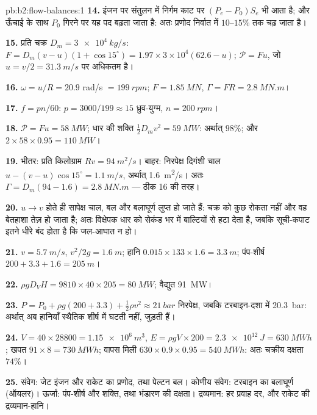 \begin{solution}{pb:b2:flow-balances:1}
\textbf{14.} इंजन पर संतुलन में निर्गम काट पर $(P_e - P_0)S_e$ भी आता है;
और ऊँचाई के साथ $P_0$ गिरने पर यह पद बढ़ता जाता है: अतः प्रणोद
निर्वात में $10$--$15\%$ तक चढ़ जाता है।

\textbf{15.} प्रति चक्र $D_m = \qty{3e4}{kg/s}$: $F = D_m(v - u)(1 + \cos15^\circ) =
1.97 \times 3 \times 10^4(62.6 - u)$; $\mathcal P = Fu$, जो $u = v/2 = \qty{31.3}{m/s}$ पर अधिकतम है।

\textbf{16.} $\omega = u/R = 20.9$ rad/s $= \qty{199}{rpm}$; $F = \qty{1.85}{MN}$, $\Gamma = FR
= \qty{2.8}{MN.m}$।

\textbf{17.} $f = pn/60$: $p = 3000/199 \approx 15$ ध्रुव-युग्म, $n = \qty{200}{rpm}$।

\textbf{18.} $\mathcal P = Fu = \qty{58}{MW}$; धार की शक्ति $\tfrac12D_mv^2 = \qty{59}{MW}$:
अर्थात् $98\%$; और $2 \times 58 \times 0.95 = \qty{110}{MW}$।

\textbf{19.} भीतर: प्रति किलोग्राम $Rv = \qty{94}{m^2/s}$। बाहर: निरपेक्ष दिगंशी चाल
$u - (v - u)\cos15^\circ = \qty{1.1}{m/s}$, अर्थात् \qty{1.6}{m^2/s}। अतः $\Gamma = D_m(94 -
1.6) = \qty{2.8}{MN.m}$ --- ठीक 16 की तरह।

\textbf{20.} $u \to v$ होते ही सापेक्ष चाल, बल और बलाघूर्ण
लुप्त हो जाते हैं: चक्र को कुछ रोकता नहीं और वह बेतहाशा तेज़ हो जाता है; अतः विक्षेपक
धार को सेकंड भर में बाल्टियों से हटा देता है, जबकि सूची-कपाट
इतने धीरे बंद होता है कि जल-आघात न हो।

\textbf{21.} $v = \qty{5.7}{m/s}$, $v^2/2g = \qty{1.6}{m}$; हानि $0.015 \times 133 \times 1.6 =
\qty{3.3}{m}$; पंप-शीर्ष $200 + 3.3 + 1.6 = \qty{205}{m}$।

\textbf{22.} $\rho gD_VH = 9810 \times 40 \times 205 = \qty{80}{MW}$; वैद्युत \qty{91}{MW}।

\textbf{23.} $P = P_0 + \rho g(200 + 3.3) + \tfrac12\rho v^2 \approx \qty{21}{bar}$ निरपेक्ष,
जबकि टरबाइन-दशा में \qty{20.3}{bar}: अर्थात् अब हानियाँ स्थैतिक शीर्ष में
घटती नहीं, जुड़ती हैं।

\textbf{24.} $V = 40 \times 28800 = \qty{1.15e6}{m^3}$, $E = \rho gV \times 200 = \qty{2.3e12}{J}
= \qty{630}{MWh}$; खपत $91 \times 8 = \qty{730}{MWh}$; वापस मिली $630 \times 0.9 \times
0.95 = \qty{540}{MWh}$: अतः चक्रीय दक्षता $74\%$।

\textbf{25.} संवेग: जेट इंजन और राकेट का प्रणोद, तथा
पेल्टन बल। कोणीय संवेग: टरबाइन का बलाघूर्ण (ऑयलर)। ऊर्जा:
पंप-शीर्ष और शक्ति, तथा भंडारण की दक्षता। द्रव्यमान: हर प्रवाह दर,
और राकेट की द्रव्यमान-हानि।
\end{solution}
